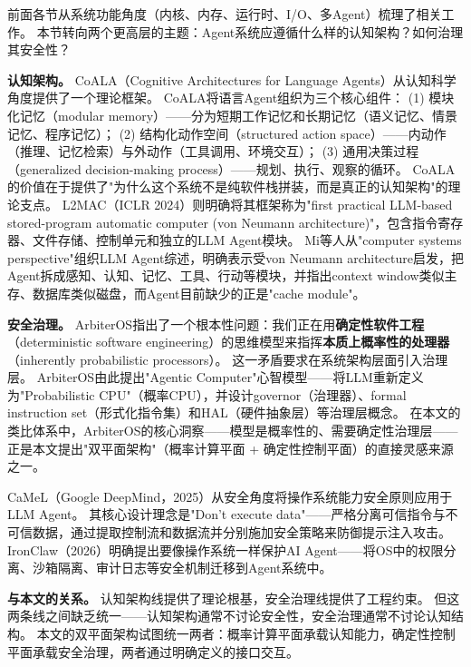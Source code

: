 前面各节从系统功能角度（内核、内存、运行时、I/O、多Agent）梳理了相关工作。
本节转向两个更高层的主题：Agent系统应遵循什么样的认知架构？如何治理其安全性？

\textbf{认知架构。}
CoALA（Cognitive Architectures for Language Agents）\cite{sumers2024coala}从认知科学角度提供了一个理论框架。
CoALA将语言Agent组织为三个核心组件：
(1) 模块化记忆（modular memory）——分为短期工作记忆和长期记忆（语义记忆、情景记忆、程序记忆）；
(2) 结构化动作空间（structured action space）——内动作（推理、记忆检索）与外动作（工具调用、环境交互）；
(3) 通用决策过程（generalized decision-making process）——规划、执行、观察的循环。
CoALA的价值在于提供了"为什么这个系统不是纯软件栈拼装，而是真正的认知架构"的理论支点。
L2MAC\cite{holt2024l2mac}（ICLR 2024）则明确将其框架称为"first practical LLM-based stored-program automatic computer (von Neumann architecture)"，包含指令寄存器、文件存储、控制单元和独立的LLM Agent模块。
Mi等人\cite{mi2025llmagentscomputersystems}从"computer systems perspective"组织LLM Agent综述，明确表示受von Neumann architecture启发，把Agent拆成感知、认知、记忆、工具、行动等模块，并指出context window类似主存、数据库类似磁盘，而Agent目前缺少的正是"cache module"。

\textbf{安全治理。}
ArbiterOS\cite{arbiteros2025}指出了一个根本性问题：我们正在用\textbf{确定性软件工程}（deterministic software engineering）的思维模型来指挥\textbf{本质上概率性的处理器}（inherently probabilistic processors）。
这一矛盾要求在系统架构层面引入治理层。
ArbiterOS由此提出"Agentic Computer"心智模型——将LLM重新定义为"Probabilistic CPU"（概率CPU），并设计governor（治理器）、formal instruction set（形式化指令集）和HAL（硬件抽象层）等治理层概念。
在本文的类比体系中，ArbiterOS的核心洞察——模型是概率性的、需要确定性治理层——正是本文提出"双平面架构"（概率计算平面 + 确定性控制平面）的直接灵感来源之一。

CaMeL\cite{debenedetti2025camel}（Google DeepMind，2025）从安全角度将操作系统能力安全原则应用于LLM Agent。
其核心设计理念是"Don't execute data"——严格分离可信指令与不可信数据，通过提取控制流和数据流并分别施加安全策略来防御提示注入攻击。
IronClaw\cite{ironclaw2025}（2026）明确提出要像操作系统一样保护AI Agent——将OS中的权限分离、沙箱隔离、审计日志等安全机制迁移到Agent系统中。

\textbf{与本文的关系。}
认知架构线提供了理论根基，安全治理线提供了工程约束。
但这两条线之间缺乏统一——认知架构通常不讨论安全性，安全治理通常不讨论认知结构。
本文的双平面架构试图统一两者：概率计算平面承载认知能力，确定性控制平面承载安全治理，两者通过明确定义的接口交互。

